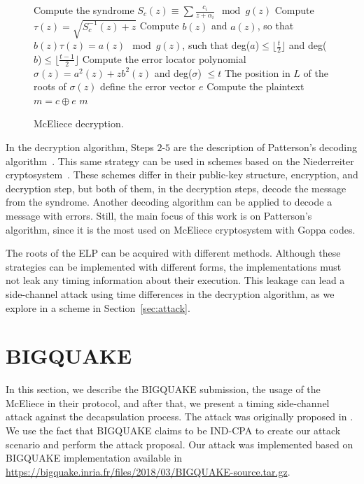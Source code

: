\begin{figure}[ht]
\centering
    \begin{algorithm}[H]
     Compute the syndrome $S_c(z) \equiv \sum{\frac{c_i}{z+\alpha_i}} \mod g(z)$\;
     Compute $\tau(z) = \sqrt{S^{-1}_{c}(z)+z}$\;
     Compute $b(z)$ and $a(z)$, so that $b(z)\tau(z) = a(z) \mod g(z)$, such that deg($a$)$\leq \lfloor \frac{t}{2} \rfloor$ and deg($b$)$\leq \lfloor \frac{t-1}{2} \rfloor$\;
     Compute the error locator polynomial $\sigma(z) = a^2(z) + zb^2(z)$ and deg($\sigma$) $\leq t$\;
     The position in $L$ of the roots of $\sigma(z)$ define the error vector $e$\;
     Compute the plaintext $m = c \oplus e$\;
     \Return $m$\;
     \caption{McEliece decryption.}\label{alg:3}
    \end{algorithm}
\end{figure}


In the decryption algorithm, Steps $2$-$5$ are the description of Patterson's decoding algorithm~\cite{patterson1975algebraic}. This same strategy can be used in schemes based on the Niederreiter cryptosystem~\cite{niederreiter}. These schemes differ in their public-key structure, encryption, and decryption step, but both of them, in the decryption steps, decode the message from the syndrome. Another decoding algorithm can be applied to decode a message with errors. Still, the main focus of this work is on Patterson's algorithm, since it is the most used on McEliece cryptosystem with Goppa codes. 

The roots of the ELP can be acquired with different methods. Although these strategies can be implemented with different forms, the implementations must not leak any timing information about their execution. This leakage can lead a side-channel attack using time differences in the decryption algorithm, as we explore in a scheme in Section~\ref{sec:attack}.

\section{BIGQUAKE}
In this section, we describe the BIGQUAKE submission, the usage of the McEliece in their protocol, and after that, we present a timing side-channel attack against the decapsulation process. The attack was originally proposed in \cite{shoufan2009timing}. We use the fact that BIGQUAKE claims to be IND-CPA to create our attack scenario and perform the attack proposal. Our attack was implemented based on BIGQUAKE implementation available in \url{https://bigquake.inria.fr/files/2018/03/BIGQUAKE-source.tar.gz}.

